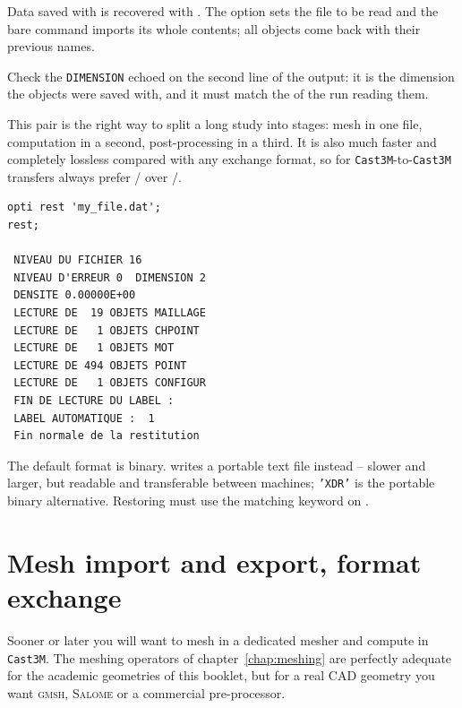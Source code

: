 \begin{castemcom}
Data saved with  is recovered with 
. The option sets the file to
be read and the bare command imports its whole contents; all objects come
back with their previous names.

Check the \texttt{DIMENSION} echoed on the second line of the output: it is
the dimension the objects were saved with, and it must match the
 of the run reading them.


This pair is the right way to split a long study into stages: mesh in one
file, computation in a second, post-processing in a third. It is also much
faster and completely lossless compared with any exchange format, so for
\texttt{Cast3M}-to-\texttt{Cast3M} transfers always prefer
/ over /.
\end{castemcom}
\begin{castemlines}
\begin{verbatim}
opti rest 'my_file.dat';
rest;

 NIVEAU DU FICHIER 16
 NIVEAU D'ERREUR 0  DIMENSION 2
 DENSITE 0.00000E+00
 LECTURE DE  19 OBJETS MAILLAGE
 LECTURE DE   1 OBJETS CHPOINT
 LECTURE DE   1 OBJETS MOT
 LECTURE DE 494 OBJETS POINT
 LECTURE DE   1 OBJETS CONFIGUR
 FIN DE LECTURE DU LABEL :
 LABEL AUTOMATIQUE :  1
 Fin normale de la restitution
\end{verbatim}
\end{castemlines}

\noindent The default format is binary. 
writes a portable text file instead -- slower and larger, but readable and
transferable between machines; \texttt{'XDR'} is the portable binary
alternative. Restoring must use the matching keyword on .

\section{Mesh import and export, format exchange}
\label{sec:io:meshexchange}

%
%
%
Sooner or later you will want to mesh in a dedicated mesher and compute in
\texttt{Cast3M}. The meshing operators of chapter~\ref{chap:meshing} are
perfectly adequate for the academic geometries of this booklet, but for a
real CAD geometry you want \textsc{gmsh}, \textsc{Salome} or a commercial
pre-processor.


